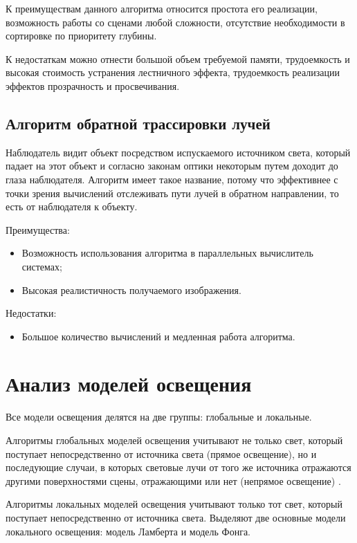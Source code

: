 К преимуществам данного алгоритма относится простота его реализации, возможность работы со сценами любой сложности, отсутствие необходимости в сортировке по приоритету глубины.

К недостаткам можно отнести большой объем требуемой памяти, трудоемкость и высокая стоимость устранения лестничного эффекта, трудоемкость реализации эффектов прозрачность и просвечивания.

\clearpage 

\subsection{Алгоритм обратной трассировки лучей}

Наблюдатель видит объект посредством испускаемого источником света,
который падает на этот объект и согласно законам оптики некоторым путем
доходит до глаза наблюдателя. Алгоритм имеет такое название, потому что
эффективнее с точки зрения вычислений отслеживать пути лучей в обратном
направлении, то есть от наблюдателя к объекту.

Преимущества:

\begin{itemize}[label=--]
	\item Возможность использования алгоритма в параллельных
	вычислитель системах;
	\item Высокая реалистичность получаемого изображения.
\end{itemize}

Недостатки:

\begin{itemize}[label=--]
	\item Большое количество вычислений и медленная работа алгоритма.
\end{itemize}

\section{Анализ моделей освещения}

Все модели освещения делятся на две группы: глобальные и локальные.

Алгоритмы глобальных моделей освещения учитывают не только свет, который поступает непосредственно от источника света (прямое освещение), но и последующие случаи, в которых световые лучи от того же источника отражаются другими поверхностями сцены, отражающими или нет (непрямое освещение) \cite{globill}.

Алгоритмы локальных моделей освещения учитывают только тот свет, который поступает непосредственно от источника света. Выделяют две основные модели локального освещения: модель Ламберта и модель Фонга.

